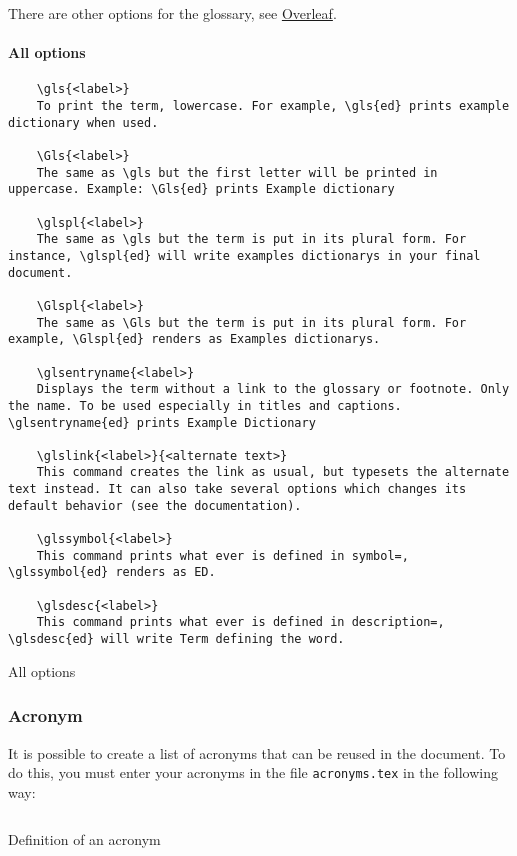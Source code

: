 There are other options for the glossary, see \href{https://fr.overleaf.com/learn/latex/Glossaries}{Overleaf}.

\paragraph{All options}

\begin{code}
    \begin{verbatim}
    \gls{<label>}
    To print the term, lowercase. For example, \gls{ed} prints example dictionary when used.

    \Gls{<label>}
    The same as \gls but the first letter will be printed in uppercase. Example: \Gls{ed} prints Example dictionary

    \glspl{<label>}
    The same as \gls but the term is put in its plural form. For instance, \glspl{ed} will write examples dictionarys in your final document.

    \Glspl{<label>}
    The same as \Gls but the term is put in its plural form. For example, \Glspl{ed} renders as Examples dictionarys.

    \glsentryname{<label>}
    Displays the term without a link to the glossary or footnote. Only the name. To be used especially in titles and captions. \glsentryname{ed} prints Example Dictionary

    \glslink{<label>}{<alternate text>}
    This command creates the link as usual, but typesets the alternate text instead. It can also take several options which changes its default behavior (see the documentation).

    \glssymbol{<label>}
    This command prints what ever is defined in symbol=, \glssymbol{ed} renders as ED.

    \glsdesc{<label>}
    This command prints what ever is defined in description=, \glsdesc{ed} will write Term defining the word.
    \end{verbatim}
    \caption{All options}
\end{code}

\subsubsection{Acronym} \label{acronym}
It is possible to create a list of acronyms that can be reused in the document.
To do this, you must enter your acronyms in the file \verb=acronyms.tex= in the following way:
\begin{code}
    \inputminted{latex}{./acronyms.tex}
    \caption{Definition of an acronym}
\end{code}

